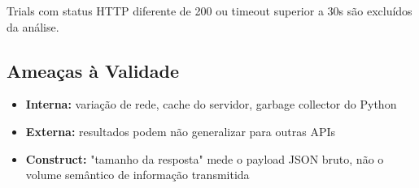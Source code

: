 Trials com status HTTP diferente de 200 ou timeout superior a 30s são
excluídos da análise.

\subsection{Ameaças à Validade}

\begin{itemize}
    \item \textbf{Interna:} variação de rede, cache do servidor, garbage
          collector do Python
    \item \textbf{Externa:} resultados podem não generalizar para outras APIs
    \item \textbf{Construct:} "tamanho da resposta" mede o payload JSON bruto,
          não o volume semântico de informação transmitida
\end{itemize}
